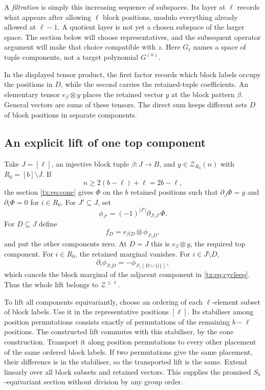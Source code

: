 \documentclass[11pt,a4paper,oneside,openany]{book}
\theoremstyle{definition}\newtheorem{definition}[theorem]{Definition}
\theoremstyle{remark}\newtheorem{remark}[theorem]{Remark}
\numberwithin{equation}{chapter}
\begin{document}
A \emph{filtration} is simply this increasing sequence of subspaces.
Its layer at $\ell$ records what appears after allowing $\ell$ block
positions, modulo everything already allowed at $\ell-1$. A quotient
layer is not yet a chosen subspace of the larger space. The section
below will choose representatives, and the subsequent operator argument
will make that choice compatible with $z$. Here $G_\ell$ names a
space of tuple components, not a target polynomial $G^{(n)}$.

In the displayed tensor product, the first factor records which block
labels occupy the positions in $D$, while the second carries the
retained-tuple coefficients. An elementary tensor $e_\beta\otimes y$
places the retained vector $y$ at the block pattern $\beta$. General
vectors are sums of these tensors. The direct sum keeps different
sets $D$ of block positions in separate components.

\subsection{An explicit lift of one top component}
Take $J=[\ell]$, an injective block tuple $\beta:J\to B$, and $y\in \mathcal Z_{R_0}(n)$ with $R_0=[b]\setminus J$. If
\[n\ge2(b-\ell)+\ell=2b-\ell,
\]
the section \eqref{tx:eq:cone} gives $\Phi$ on the $b$ retained positions such that $\partial_J\Phi=y$ and $\partial_i\Phi=0$ for $i\in R_0$. For $J'\subseteq J$, set
\[\phi_{J'}=(-1)^{|J'|}\partial_{J\setminus J'}\Phi.
\]
For $D\subseteq J$ define
\[f_D=e_{\beta|D}\otimes\phi_{J\setminus D},
\]
and put the other components zero. At $D=J$ this is $e_\beta\otimes y$, the required top component. For $i\in R_0$, the retained marginal vanishes. For $i\in J\setminus D$,
\[\partial_i\phi_{J\setminus D}=-\phi_{J\setminus(D\cup\{i\})},
\]
which cancels the block marginal of the adjacent component in \eqref{tx:eq:cycleeq}. Thus the whole lift belongs to $\mathcal Z^{\le \ell}$.

To lift all components equivariantly, choose an ordering of each $\ell$-element subset of block labels. Use it in the representative positions $[\ell]$. Its stabiliser among position permutations consists exactly of permutations of the remaining $b-\ell$ positions. The constructed lift commutes with this stabiliser, by the cone construction. Transport it along position permutations to every other placement of the same ordered block labels. If two permutations give the same placement, their difference is in the stabiliser, so the transported lift is the same. Extend linearly over all block subsets and retained vectors. This supplies the promised $S_b$-equivariant section without division by any group order.
\end{document}
